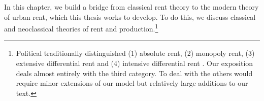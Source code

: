 In this chapter, we build a bridge from \gls{classical rent theory} to the modern theory of urban rent, which this thesis works to develop. To do this, we discuss classical and neoclassical theories of rent and production.\footnote{Political  traditionally distinguished (1) absolute  rent, (2) monopoly rent, (3) extensive differential rent and (4) intensive differential rent \cite{jagerUrbanLandRent2003}.  Our exposition deals almost entirely with the third category.  To deal with the others would require minor extensions of our model but relatively large additions to our text.} 

